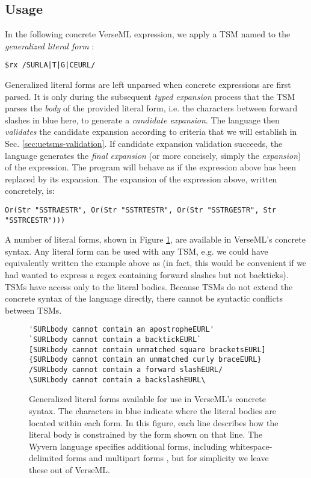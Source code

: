 \subsection{Usage}\label{sec:uetsms-usage}
In the following concrete VerseML expression, we apply a TSM named  to the \emph{generalized literal form} :
\begin{lstlisting}[numbers=none,mathescape=|]
$rx /SURLA|T|G|CEURL/
\end{lstlisting}
Generalized literal forms are left unparsed when concrete expressions are first parsed. It is only during the subsequent \emph{typed expansion} process that the TSM parses the \emph{body} of the provided literal form, i.e. the characters between forward slashes in blue here, to generate a \emph{candidate expansion}. The language then \emph{validates} the candidate expansion according to criteria that we will establish in Sec. \ref{sec:uetsms-validation}. If candidate expansion validation succeeds, the language generates the \emph{final expansion} (or more concisely, simply the \emph{expansion}) of the expression. The program will behave as if the expression above has been replaced by its expansion. The expansion of the expression above, written concretely, is:
\begin{lstlisting}[numbers=none]
Or(Str "SSTRAESTR", Or(Str "SSTRTESTR", Or(Str "SSTRGESTR", Str "SSTRCESTR")))
\end{lstlisting}

A number of literal forms, shown in Figure \ref{fig:literal-forms},  are available in VerseML's concrete syntax. Any literal form can be used with any TSM, e.g. we could have equivalently written the example above as  (in fact, this would be convenient if we had wanted to express a regex containing forward slashes but not backticks). TSMs have access only to the literal bodies. Because TSMs do not extend the concrete syntax of the language directly, there cannot be syntactic conflicts between TSMs.


\begin{figure}
\begin{lstlisting}
'SURLbody cannot contain an apostropheEURL'
`SURLbody cannot contain a backtickEURL`
[SURLbody cannot contain unmatched square bracketsEURL]
{SURLbody cannot contain an unmatched curly braceEURL}
/SURLbody cannot contain a forward slashEURL/
\SURLbody cannot contain a backslashEURL\
\end{lstlisting}
\caption[Available Generalized Literal Forms]{Generalized literal forms available for use in VerseML's concrete syntax. The characters in blue indicate where the literal bodies are located within each form. In this figure, each line describes how the literal body is constrained by the form shown on that line. The Wyvern language specifies additional forms, including whitespace-delimited forms \cite{TSLs} and multipart forms \cite{sac15}, but for simplicity we leave these out of VerseML.}
\label{fig:literal-forms}
\end{figure}
